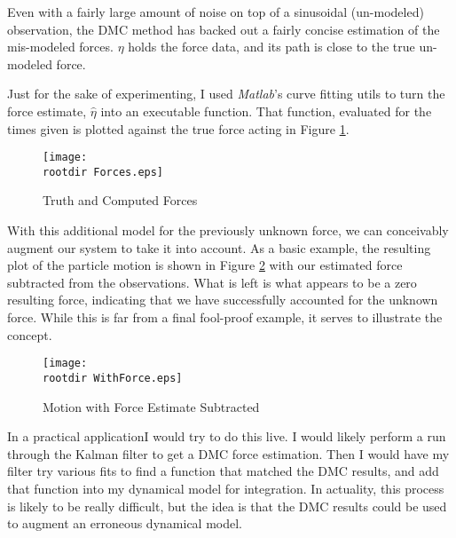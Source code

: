 \documentclass[]{article}
\newcommand{\rootdir}{./Figures/}
\begin{document}
Even with a fairly large amount of noise on top of a sinusoidal (un-modeled) observation, the DMC method has backed out a fairly concise estimation of the mis-modeled forces. $\eta$ holds the force data, and its path is close to the true un-modeled force. 

Just for the sake of experimenting, I used \emph{Matlab}'s curve fitting utils to turn the force estimate, $\hat{\eta}$ into an executable function. That function, evaluated for the times given is plotted against the true force acting in Figure \ref{fig:ForceComparison}. 

\begin{center}
	\begin{figure}[H]
		\texttt{[image: \\rootdir Forces.eps]}
		\caption{Truth and Computed Forces}
		\label{fig:ForceComparison}
	\end{figure}
\end{center}

With this additional model for the previously unknown force, we can conceivably augment our system to take it into account. As a basic example, the resulting plot of the particle motion is shown in Figure \ref{fig:WithForces} with our estimated force subtracted from the observations. What is left is what appears to be a zero resulting force, indicating that we have successfully accounted for the unknown force. While this is far from a final fool-proof example, it serves to illustrate the concept. 

\begin{center}
	\begin{figure}[H]
		\texttt{[image: \\rootdir WithForce.eps]}
		\caption{Motion with Force Estimate Subtracted}
		\label{fig:WithForces}
	\end{figure}
\end{center}

In a practical applicationI would try to do this live. I would likely perform a run through the Kalman filter to get a DMC force estimation. Then I would have my filter try various fits to find a function that matched the DMC results, and add that function into my dynamical model for integration. In actuality, this process is likely to be really difficult, but the idea is that the DMC results could be used to augment an erroneous dynamical model. 
\end{document}
